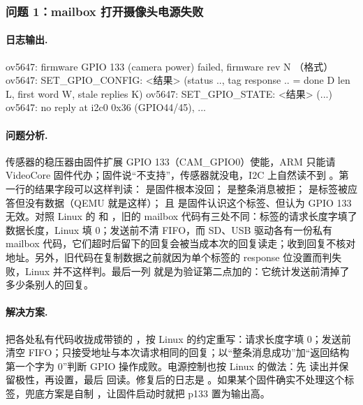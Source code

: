 \subsubsection{问题 1：mailbox 打开摄像头电源失败}

\paragraph{日志输出.}
\begin{txtcode}
ov5647: firmware GPIO 133 (camera power) failed, firmware rev N          （格式）
ov5647:   SET_GPIO_CONFIG: <结果> (status .., tag response .. = done D len L,
          first word W, stale replies K)
ov5647:   SET_GPIO_STATE:  <结果> (...)
ov5647: no reply at i2c0 0x36 (GPIO44/45), ...
\end{txtcode}

\paragraph{问题分析.} 传感器的稳压器由固件扩展 GPIO 133（CAM\_GPIO0）使能，ARM 只能请 VideoCore 固件代办；固件说“不支持”，传感器就没电，I2C 上自然读不到 。第一行的结果字段可以这样判读： 是固件根本没回； 是整条消息被拒； 是标签被应答但没有数据（QEMU 就是这样）； 且  是固件认识这个标签、但认为 GPIO 133 无效。对照 Linux 的  和 ，旧的 mailbox 代码有三处不同：标签的请求长度字填了数据长度，Linux 填 0；发送前不清 FIFO，而 SD、USB 驱动各有一份私有 mailbox 代码，它们超时后留下的回复会被当成本次的回复读走；收到回复不核对地址。另外，旧代码在复制数据之前就因为单个标签的 response 位没置而判失败，Linux 并不这样判。最后一列  就是为验证第二点加的：它统计发送前清掉了多少条别人的回复。

\paragraph{解决方案.} 把各处私有代码收拢成带锁的 ，按 Linux 的约定重写：请求长度字填 0；发送前清空 FIFO；只接受地址与本次请求相同的回复；以“整条消息成功”加“返回结构第一个字为 0”判断 GPIO 操作成败。电源控制也按 Linux 的做法：先  读出并保留极性，再设置，最后  回读。修复后的日志是 。如果某个固件确实不处理这个标签，兜底方案是自制 ，让固件启动时就把 p133 置为输出高。

